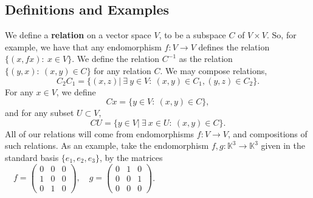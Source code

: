 \documentclass[11pt,oneside]{amsbook}
\numberwithin{equation}{section}
\theoremstyle{plain}
\theoremstyle{definition}
\theoremstyle{remark}
\newcommand{\KK}{\mathbb{K}}
\begin{document}
	\subsection{Definitions and Examples}
	We define a \textbf{relation} on a vector space $V$, to be a subspace $C$ of $V \times V$. So, for example, we have that any endomorphism $f: V \to V$ defines the relation $\{(x, fx): \ x \in V\}$. We define the relation $C^{-1}$ as the relation $\{(y,x): \ (x,y) \in C\}$ for any relation $C$. We may compose relations, 
	\[ C_2C_1 = \{(x,z)| \ \exists \ y \in V:\ (x,y) \in C_1, (y,z) \in C_2\}.\]
	For any $x \in V$, we define 
	\[ Cx = \{y \in V: \ (x,y) \in C\},\]
	and for any subset $U \subset V$, 
	\[ CU = \{y \in V| \ \exists \ x \in U: \ (x,y) \in C\}.\]
	All of our relations will come from endomorphisms $f: V \to V$, and compositions of such relations. As an example, take the endomorphism $f, g: \KK^3 \to \KK^3$ given in the standard basis $\{e_1, e_2, e_3\}$, by the matrices \\
	\bigskip
	$ \quad f = \begin{pmatrix}
		0 & 0 & 0 \\
		1 & 0 & 0 \\
		0 & 1 & 0
	\end{pmatrix}, \quad g = \begin{pmatrix}
		0 & 1 & 0 \\
		0 & 0 & 1 \\
		0 & 0 & 0
	\end{pmatrix}
	$. \\
	
\end{document}
